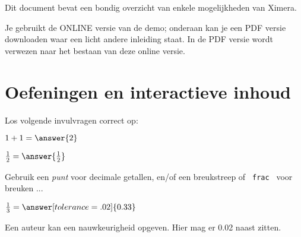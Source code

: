 \documentclass{ximera}
\begin{document}
    \author{Wim Obbels}
    \label{xim:ximeraDemo}

Dit document bevat een bondig overzicht van enkele mogelijkheden van Ximera. 


\begin{onlineOnly}
    Je gebruikt de ONLINE versie van de demo; onderaan kan je een PDF versie downloaden waar een licht andere inleiding staat. In de PDF versie wordt verwezen naar het bestaan van deze online versie.
\end{onlineOnly}


\section{Oefeningen en interactieve inhoud}\label{sec:demo:voorbeelden_problemen}
\begin{exercise}    
    Los volgende invulvragen correct op:
    \begin{question}
        $1+1 = \answer{2}$\label{itm:showCase:voorbeeld_answer}    
    \end{question}
%        
    \begin{question}
         $\frac{1}{2} =  \answer{\frac{1}{2}}$  
         
         \begin{onlineOnly}
         Gebruik een \textit{punt} voor decimale getallen, en/of een breukstreep of \verb| frac | voor breuken ...
         \end{onlineOnly}
         
    \end{question}
    \begin{question}
        $\frac{1}{3} =  \answer[tolerance=.02]{0.33}$  
        
        Een auteur kan een nauwkeurigheid opgeven. Hier mag er 0.02 naast zitten.
    \end{question}
\end{exercise}
\end{document}
